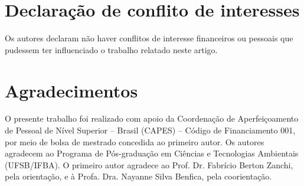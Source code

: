\documentclass[a4paper,fleqn]{cas-sc}
\begin{document}
\section*{Declaração de conflito de interesses}
Os autores declaram não haver conflitos de interesse financeiros ou pessoais que pudessem ter influenciado o trabalho relatado neste artigo.

\section*{Agradecimentos}
O presente trabalho foi realizado com apoio da Coordenação de Aperfeiçoamento de Pessoal de Nível Superior -- Brasil (CAPES) -- Código de Financiamento 001, por meio de bolsa de mestrado concedida ao primeiro autor. Os autores agradecem ao Programa de Pós-graduação em Ciências e Tecnologias Ambientais (UFSB/IFBA). O primeiro autor agradece ao Prof. Dr. Fabrício Berton Zanchi, pela orientação, e à Profa. Dra. Nayanne Silva Benfica, pela coorientação.

\printcredits



\end{document}
